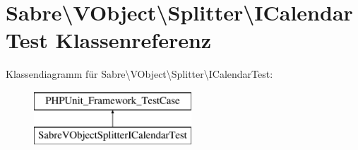 \hypertarget{class_sabre_1_1_v_object_1_1_splitter_1_1_i_calendar_test}{}\section{Sabre\textbackslash{}V\+Object\textbackslash{}Splitter\textbackslash{}I\+Calendar\+Test Klassenreferenz}
\label{class_sabre_1_1_v_object_1_1_splitter_1_1_i_calendar_test}
Klassendiagramm für Sabre\textbackslash{}V\+Object\textbackslash{}Splitter\textbackslash{}I\+Calendar\+Test\+:\begin{figure}[H]
\begin{center}
\leavevmode
\includegraphics[height=2.000000cm]{class_sabre_1_1_v_object_1_1_splitter_1_1_i_calendar_test}
\end{center}
\end{figure}
